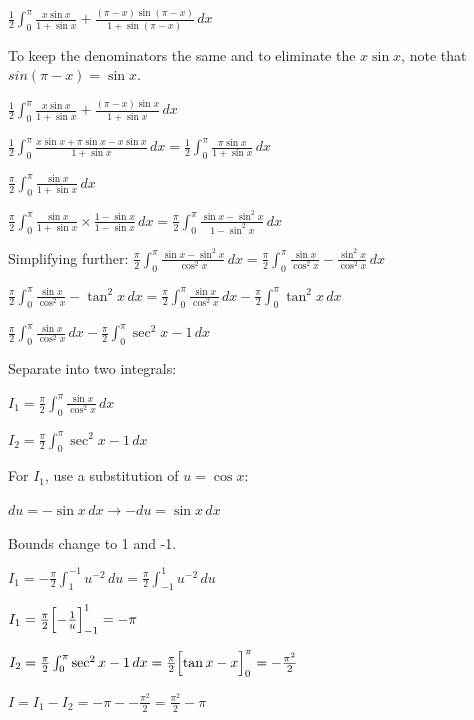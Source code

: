 \documentclass[../main.tex]{subfiles}
\begin{document}
\begin{enumerate}[itemsep=0.7cm]
    $\frac{1}{2}\int_0^{\pi} \frac{x\sin{x}}{1+\sin{x}}+\frac{(\pi-x)\sin{(\pi-x)}}{1+\sin{(\pi-x)}}\,dx$

    To keep the denominators the same and to eliminate the $x\sin{x}$, note that $sin{(\pi-x)}=\sin{x}$.

    $\frac{1}{2}\int_0^{\pi} \frac{x\sin{x}}{1+\sin{x}}+\frac{(\pi-x)\sin{x}}{1+\sin{x}}\,dx$

    $\frac{1}{2}\int_0^{\pi} \frac{x\sin{x}+\pi\sin{x}-x\sin{x}}{1+\sin{x}}\,dx=\frac{1}{2}\int_0^{\pi} \frac{\pi\sin{x}}{1+\sin{x}}\,dx$

    $\frac{\pi}{2}\int_0^{\pi} \frac{\sin{x}}{1+\sin{x}}\,dx$

    $\frac{\pi}{2}\int_0^{\pi} \frac{\sin{x}}{1+\sin{x}}\times \frac{1-\sin{x}}{1-\sin{x}}\,dx=\frac{\pi}{2}\int_0^{\pi} \frac{\sin{x}-\sin^2{x}}{1-\sin^2{x}}\,dx$

    Simplifying further:
    $\frac{\pi}{2}\int_0^{\pi} \frac{\sin{x}-\sin^2{x}}{\cos^2{x}}\,dx=\frac{\pi}{2}\int_0^{\pi} \frac{\sin{x}}{\cos^2{x}}-\frac{\sin^2{x}}{\cos^2{x}}\,dx$

    $\frac{\pi}{2}\int_0^{\pi} \frac{\sin{x}}{\cos^2{x}}-\tan^2{x}\,dx=\frac{\pi}{2}\int_0^{\pi} \frac{\sin{x}}{\cos^2{x}}\,dx-\frac{\pi}{2}\int_0^{\pi}\tan^2{x}\,dx$

    $\frac{\pi}{2}\int_0^{\pi} \frac{\sin{x}}{\cos^2{x}}\,dx-\frac{\pi}{2}\int_0^{\pi}\sec^2{x}-1\,dx$

    Separate into two integrals:

    $I_1=\frac{\pi}{2}\int_0^{\pi} \frac{\sin{x}}{\cos^2{x}}\,dx$

    $I_2=\frac{\pi}{2}\int_0^{\pi}\sec^2{x}-1\,dx$

    For $I_1$, use a substitution of $u=\cos{x}$:

    $du=-\sin{x}\,dx \rightarrow -du=\sin{x}\,dx$

    Bounds change to 1 and -1.

    $I_1=-\frac{\pi}{2}\int_1^{-1}u^{-2}\,du=\frac{\pi}{2}\int_{-1}^1 u^{-2}\,du$

    $I_1=\frac{\pi}{2}\Bigl[-\frac{1}{u}\Bigr]_{-1}^1=-\pi$

    $I_2=\frac{\pi}{2}\int_0^{\pi}\sec^2{x}-1\,dx=\frac{\pi}{2}\Bigl[\tan{x}-x\Bigr]_0^{\pi}=-\frac{\pi^2}{2}$

    $I=I_1 - I_2 = -\pi - -\frac{\pi^2}{2}=\frac{\pi^2}{2}-\pi$

\end{enumerate}


\pagebreak
\end{document}
